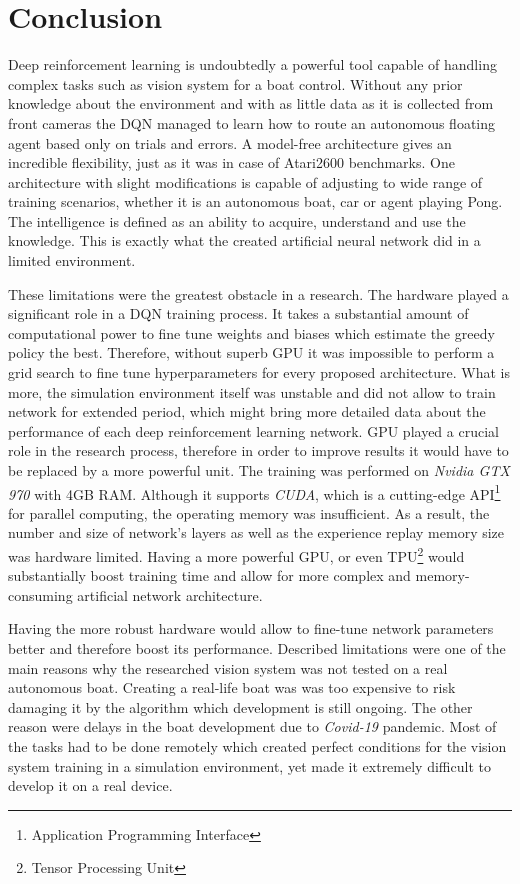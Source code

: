 \chapter{Conclusion}
\label{cha:conclusion}

Deep reinforcement learning is undoubtedly a powerful tool capable of handling complex tasks such as vision system for a boat control.
Without any prior knowledge about the environment and with as little data as it is collected from front cameras the DQN managed to
learn how to route an autonomous floating agent based only on trials and errors. A model-free architecture gives an incredible
flexibility, just as it was in case of Atari2600 benchmarks. One architecture with slight modifications is capable of adjusting to wide
range of training scenarios, whether it is an autonomous boat, car or agent playing Pong. The intelligence is defined as an ability to
acquire, understand and use the knowledge. This is exactly what the created artificial neural network did in a limited environment.

These limitations were the greatest obstacle in a research. The hardware played a significant role in a DQN training process. It takes a
substantial amount of computational power to fine tune weights and biases which estimate the greedy policy the best. Therefore, without
superb GPU it was impossible to perform a grid search to fine tune hyperparameters for every proposed architecture. What is more, the
simulation environment itself was unstable and did not allow to train network for extended period, which might bring more detailed data
about the performance of each deep reinforcement learning network. GPU played a crucial role in the research process, therefore in order
to improve results it would have to be replaced by a more powerful unit. The training was performed on \emph{Nvidia GTX 970} with 4GB RAM. Although it supports \emph{CUDA}, which is a cutting-edge API\footnote{Application Programming Interface} for parallel computing, the
operating memory was insufficient. As a result, the number and size of network's layers as well as the experience replay memory size was
hardware limited. Having a more powerful GPU, or even TPU\footnote{Tensor Processing Unit} would substantially boost training time and
allow for more complex and memory-consuming artificial network architecture.

Having the more robust hardware would allow to fine-tune network parameters better and therefore boost its performance. Described
limitations were one of the main reasons why the researched vision system was not tested on a real autonomous boat. Creating a real-life
boat was was too expensive to risk damaging it by the algorithm which development is still ongoing. The other reason were delays in the
boat development due to \emph{Covid-19} pandemic. Most of the tasks had to be done remotely which created perfect conditions for the vision system training in a simulation environment, yet made it extremely difficult to develop it on a real device.

